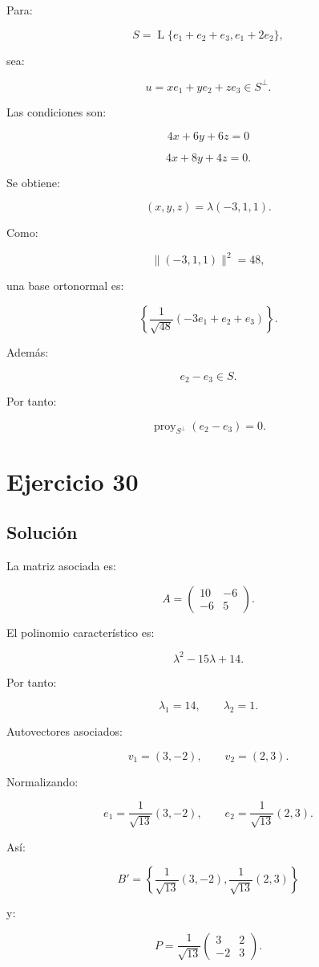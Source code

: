\documentclass[11pt,a4paper]{article}
\newcommand{\Span}{\operatorname{L}}
\newcommand{\proy}{\operatorname{proy}}
\begin{document}
Para:

\[
S=
\Span\{e_1+e_2+e_3,e_1+2e_2\},
\]

sea:

\[
u=xe_1+ye_2+ze_3\in S^\perp.
\]

Las condiciones son:

\[
4x+6y+6z=0
\]

\[
4x+8y+4z=0.
\]

Se obtiene:

\[
(x,y,z)=\lambda(-3,1,1).
\]

Como:

\[
\|(-3,1,1)\|^2=48,
\]

una base ortonormal es:

\[
\boxed{
\left\{
\frac1{\sqrt{48}}(-3e_1+e_2+e_3)
\right\}.
}
\]

Además:

\[
e_2-e_3\in S.
\]

Por tanto:

\[
\boxed{
\proy_{S^\perp}(e_2-e_3)=0.
}
\]

\section{Ejercicio 30}
\subsection{Solución}

La matriz asociada es:

\[
A=
\begin{pmatrix}
10&-6\\
-6&5
\end{pmatrix}.
\]

El polinomio característico es:

\[
\lambda^2-15\lambda+14.
\]

Por tanto:

\[
\lambda_1=14,
\qquad
\lambda_2=1.
\]

Autovectores asociados:

\[
v_1=(3,-2),
\qquad
v_2=(2,3).
\]

Normalizando:

\[
e_1=
\frac1{\sqrt{13}}(3,-2),
\qquad
e_2=
\frac1{\sqrt{13}}(2,3).
\]

Así:

\[
\boxed{
B'=
\left\{
\frac1{\sqrt{13}}(3,-2),
\frac1{\sqrt{13}}(2,3)
\right\}
}
\]

y:

\[
\boxed{
P=
\frac1{\sqrt{13}}
\begin{pmatrix}
3&2\\
-2&3
\end{pmatrix}.
}
\]
\end{document}
